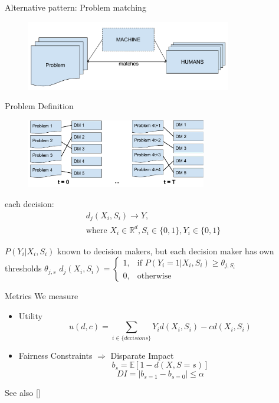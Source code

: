 \documentclass[11pt]{beamer}
\begin{document}
\begin{frame}{Alternative pattern: Problem matching}
\begin{figure}[t!]
	\centering
\includegraphics[width=0.8\textwidth]{Figures/matching.pdf}
\end{figure}
\end{frame}

\begin{frame}{Problem Definition}
\begin{figure}[t!]
\centering
\includegraphics[width=0.7\textwidth]{Figures/matching_unfolded.pdf}
\end{figure}
each decision:
\begin{equation*}
\begin{gathered}
d_j(X_i,S_i)\rightarrow Y, \\
\text{where } X_i \in \mathbb{R}^d,  S_i \in \{0,1\}, Y_i \in \{0,1\}
\end{gathered}
\end{equation*}
\begin{center}
 $P(Y_i|X_i,S_i)$ known to decision makers, but each decision maker has own thresholds $\theta_{j,s}$
$
d_j(X_i,S_i) = 
\begin{cases}
1, & {\text{if } P(Y_i=1|X_i,S_i)\ge \theta_{j,S_i}} \\
0, & \text{otherwise}
\end{cases}
$
\end{center}
\end{frame}

\begin{frame}{Metrics}
We measure
\begin{itemize}
\item Utility
$$u(d,c)=\sum_{i\in \{decisions\}} Y_id(X_i,S_i)-cd(X_i,S_i)$$
\item Fairness Constraints \newline
$\Rightarrow$ Disparate Impact 
$$b_{s}= \mathbb{E} [1-d(X,S=s)]$$
$$DI=|b_{s=1}-b_{s=0}|\le \alpha$$
\end{itemize}
{\footnotesize See also [\cite{corbett2017algorithmic}]}
\end{frame}
\end{document}
